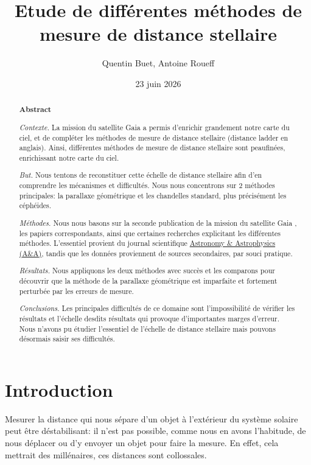 \documentclass[12pt,a4paper,french]{scrartcl}
\title{Etude de différentes méthodes de mesure de distance stellaire}
\author{Quentin Buet, Antoine Roueff}
\date{23 juin 2026}
\begin{document}
\vfill %
\maketitle
\vfill
\begin{abstract}
    \begin{center}
        \textbf{Abstract}
    \end{center}

    \textit{Contexte. }La mission du satellite Gaia a permis d'enrichir grandement notre carte du ciel, 
    et de compléter les méthodes de mesure de distance stellaire (distance ladder en anglais).
    Ainsi, différentes méthodes de mesure de distance stellaire sont peaufinées, enrichissant notre carte du ciel.

    \textit{But. }Nous tentons de reconstituer cette échelle de distance stellaire 
     afin d'en comprendre les mécanismes et difficultés. Nous nous concentrons sur 2 méthodes principales: 
     la parallaxe géométrique et les chandelles standard, plus précisément les céphéides.

    \textit{Méthodes. }Nous nous basons sur la seconde publication de la mission du satellite Gaia \citep{DR2}, 
    les papiers correspondants, ainsi que certaines recherches explicitant les différentes méthodes.
    L'essentiel provient du journal scientifique \href{https://www.aanda.org/}{Astronomy \& Astrophysics (A\&A)}, 
    tandis que les données proviennent de sources secondaires, par souci pratique.

    \textit{Résultats. }Nous appliquons les deux méthodes avec succès et les comparons pour découvrir que 
    la méthode de la parallaxe géométrique est imparfaite et fortement perturbée par les erreurs de mesure.

    \textit{Conclusions. }Les principales difficultés de ce domaine sont l'impossibilité de vérifier les résultats et 
    l'échelle desdits résultats qui provoque d'importantes marges d'erreur. Nous n'avons pu étudier l'essentiel de l'échelle de distance stellaire
    mais pouvons désormais saisir ses difficultés.
\end{abstract}
\vfill
\pagebreak

\tableofcontents

\newpage 

\section{Introduction}
Mesurer la distance qui nous sépare d'un objet à l'extérieur du système solaire peut être 
déstabilisant: il n'est pas possible, comme nous en avons l'habitude, de nous déplacer ou d'y envoyer un objet pour faire la mesure.
En effet, cela mettrait des millénaires, ces distances sont collossales.
\end{document}
